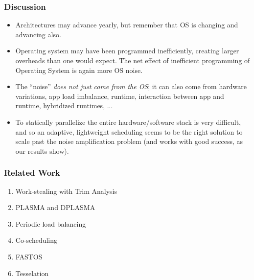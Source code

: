 \begin{frame}[Discussion]
\frametitle{Discussion} 
\begin{itemize}
\item \small Architectures may advance yearly, but remember that OS is changing and advancing also.
\item \small Operating system may have been programmed 
inefficiently, creating larger overheads than 
one would expect. The net effect of inefficient
programming of Operating System is again more OS noise. 
\item \small  The ``noise'' \textit{does not just come from the OS}; it 
can also come from hardware variations, app load imbalance, runtime, 
interaction between app and runtime, hybridized runtimes, ... \\  
\item \small To statically parallelize the entire
hardware/software stack is very difficult, and so an adaptive, lightweight scheduling
seems to be the right solution to scale past the noise amplification problem
(and works with good success, as our results show). 
\end{itemize}
\end{frame}


\begin{frame} 
\frametitle{Related Work}
\begin{enumerate}
\item Work-stealing with Trim Analysis 
\item PLASMA and DPLASMA 
\item Periodic load balancing
\item Co-scheduling
\item FASTOS
\item Tesselation 
\end{enumerate} 
\end{frame} 


